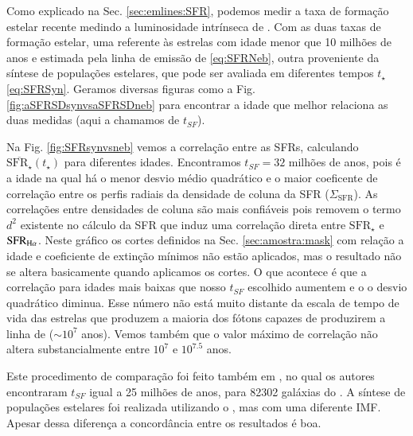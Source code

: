 Como explicado na Sec. \ref{sec:emlines:SFR}, podemos medir a taxa de formação estelar recente
medindo a luminosidade intrínseca de \Halpha. Com as duas taxas de formação estelar, uma referente
às estrelas com idade menor que 10 milhões de anos e estimada pela linha de emissão de \Halpha
\eqref{eq:SFRNeb}, outra proveniente da síntese de populações estelares, que pode ser avaliada em
diferentes tempos $t_\star$ \eqref{eq:SFRSyn}. Geramos diversas figuras como a Fig.
\ref{fig:aSFRSDsynvsaSFRSDneb} para encontrar a idade que melhor relaciona as duas medidas (aqui a
chamamos de $t_{SF}$).

Na Fig. \ref{fig:SFRsynvsneb} vemos a correlação entre as SFRs, calculando
$\overline{\mathrm{SFR}_\star}(t_\star)$ para diferentes idades. Encontramos $t_{SF} = 32$ milhões
de anos, pois é a idade na qual há o menor desvio médio quadrático e o maior coeficente de
correlação entre os perfis radiais da densidade de coluna da SFR ($\Sigma_{\mathrm{SFR}}$). As
correlações entre densidades de coluna são mais confiáveis pois removem o termo $d^2$ existente no
cálculo da SFR que induz uma correlação direta entre $\mathrm{SFR}_\star$ e
$\mathrm{SFR}_{\Halpha}$. Neste gráfico os cortes definidos na Sec.
\ref{sec:amostra:mask} com relação a idade e coeficiente de extinção mínimos não estão aplicados,
mas o resultado não se altera basicamente quando aplicamos os cortes. O que acontece é que a
correlação para idades mais baixas que nosso $t_{SF}$ escolhido aumentem e o o desvio quadrático
diminua. Esse número não está muito distante da escala de tempo de vida das estrelas que produzem a
maioria dos fótons capazes de produzirem a linha de \Halpha ($\sim10^7$ anos). Vemos também que o
valor máximo de correlação não altera substancialmente entre $10^7$ e $10^{7.5}$ anos.

Este procedimento de comparação foi feito também em \citet{Asari.etal.2007a}, no qual os autores
encontraram $t_{SF}$ igual a 25 milhões de anos, para 82302 galáxias do \SDSS. A síntese de
populações estelares foi realizada utilizando o \starlight, mas com uma diferente IMF. Apesar dessa
diferença a concordância entre os resultados é boa.


